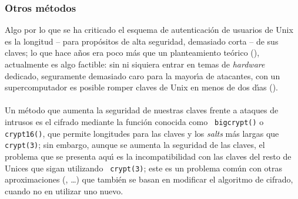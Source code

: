 \subsubsection{Otros m\'etodos}
Algo por lo que se ha criticado el esquema de autenticaci\'on de usuarios de
Unix es la longitud -- para prop\'ositos de alta seguridad, demasiado corta --
de sus claves; lo que hace a\~nos era poco m\'as que un planteamiento 
te\'orico (\cite{kn:dif77}), actualmente es algo factible: sin ni siquiera 
entrar en temas de {\it hardware} dedicado, seguramente demasiado caro para la
mayor\'{\i}a de atacantes, con un supercomputador es posible romper claves de 
Unix en menos de dos d\'{\i}as (\cite{kn:ked99}).\\
\\Un m\'etodo que aumenta la seguridad de nuestras claves frente a 
ataques de intrusos es el cifrado mediante la funci\'on conocida como {\tt 
bigcrypt()} o {\tt crypt16()}, que permite longitudes para las claves y los 
{\it salts} m\'as largas que {\tt crypt(3)}; sin embargo, aunque se aumenta
la seguridad de las claves, el problema que se presenta aqu\'{\i} es la 
incompatibilidad con las claves del resto de Unices que sigan utilizando {\tt 
crypt(3)}; este es un problema com\'un con otras aproximaciones 
(\cite{kn:man96}, \cite{kn:ked99}\ldots) que tambi\'en se basan en modificar el
algoritmo de cifrado, cuando no en utilizar uno nuevo.
